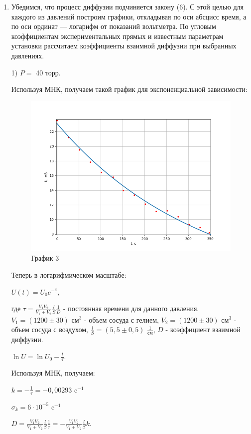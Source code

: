 \documentclass[a4paper,12pt]{article} %
\begin{document}
\begin{enumerate}
\item Убедимся, что процесс диффузии подчиняется закону (6). С этой целью для каждого из давлений построим графики, откладывая по оси абсцисс время, а по оси ординат — логарифм от показаний вольтметра. По угловым коэффициентам экспериментальных прямых и известным параметрам установки рассчитаем коэффициенты взаимной диффузии при выбранных давлениях.


1) $P = $ 40 торр.

Используя МНК, получаем такой график для экспоненциальной зависимости:
\newpage
\begin{figure}[h!]
	\centering
	\includegraphics[scale=0.8]{График1(эксп).png}
	\caption*{График 3}
\end{figure}

Теперь в логарифмическом масштабе:

$U(t) = U_{0}e^{-\frac{t}{\tau}}$,


где $\tau = \frac{V_{1}V_{2}}{V_{1} + V_{2}}\frac{l}{S}\frac{1}{D}$ - постоянная времени для данного давления. $V_{1} = (1200\pm 30)$ см$^{3}$ - объем сосуда с гелием, $V_{2} = (1200\pm 30)$ см$^{3}$ - объем сосуда с воздухом, $\frac{l}{S} = (5,5\pm 0,5)$ $\frac{1}{\text{см}}$, $D$ - коэффициент взаимной диффузии.  
	
	
$\ln{U} = \ln{U_{0}} - \frac{t}{\tau}$.

Используя МНК, получаем:

$k = -\frac{1}{\tau} = -0,00293$ c$^{-1}$

$\sigma_{k} = 6\cdot 10^{-5}$ c$^{-1}$

$D = \frac{V_{1}V_{2}}{V_{1} + V_{2}}\frac{l}{S}\frac{1}{\tau} = - \frac{V_{1}V_{2}}{V_{1} + V_{2}}\frac{l}{S}k$.


\end{enumerate}
\end{document}
